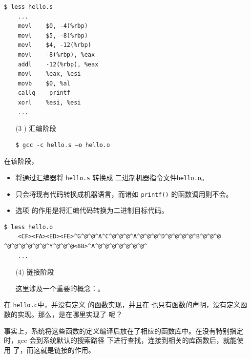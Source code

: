 \begin{frame}[fragile]\ft{\secname}
  \begin{lstlisting}[basicstyle=\ttfamily\footnotesize,backgroundcolor=\color{red!10}]
    $ less hello.s
    ...
    movl    $0, -4(%rbp)
    movl    $5, -8(%rbp)
    movl    $4, -12(%rbp)
    movl    -8(%rbp), %eax
    addl    -12(%rbp), %eax
    movl    %eax, %esi
    movb    $0, %al
    callq   _printf
    xorl    %esi, %esi
    ...      
  \end{lstlisting}
\end{frame}


\begin{frame}[fragile]\ft{\secname}
  \begin{itemize}
  \item[(3 )] 汇编阶段
\begin{lstlisting}[backgroundcolor=\color{red!10}]
$ gcc -c hello.s –o hello.o
\end{lstlisting}   
\end{itemize}

在该阶段，
\begin{itemize}
\item 将通过汇编器将 \lstinline|hello.s| 转换成  二进制机器指令文件\lstinline|hello.o|。
\item 只会将现有代码转换成机器语言，而诸如 \lstinline|printf()| 的函数调用则不会。
\item 选项  的作用是将汇编代码转换为二进制目标代码。
\end{itemize}
\end{frame}


\begin{frame}[fragile]\ft{\secname}
  \begin{lstlisting}[backgroundcolor=\color{red!10}]
    $ less hello.o
    <CF><FA><ED><FE>^G^@^@^A^C^@^@^@^A^@^@^@^D^@^@^@^@^B^@^@^@ ^@^@^@^@^@^@^Y^@^@^@<88>^A^@^@^@^@^@^@^@^
    ...      
  \end{lstlisting}

\end{frame}


\begin{frame}[fragile]\ft{\secname}
  \begin{itemize}
  \item[(4)] 链接阶段
  \item[] 
    这里涉及一个重要的概念：。 
  \end{itemize} \pause
  \begin{question}[]{}
    在 \lstinline|hello.c|中，并没有定义  的函数实现，并且在  也只有函数的声明，没有定义函数的实现。那么，是在哪里实现了  呢？
  \end{question} \pause

  事实上，系统将这些函数的定义编译后放在了相应的函数库中。在没有特别指定时，gcc 会到系统默认的搜索路径  下进行查找，连接到相关的库函数后，就能使用 了，而这就是链接的作用。
 
\end{frame}


